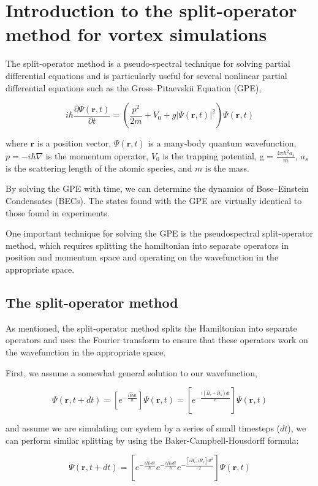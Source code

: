 \chapter{Introduction to the split-operator method for vortex simulations}
\label{ch-splitop}

The split-operator method is a pseudo-spectral technique for solving partial differential equations and is particularly useful for several nonlinear partial differential equations such as the Gross--Pitaevskii Equation (GPE),

$$
i \hbar \frac{\partial \Psi(\mathbf{r},t)}{\partial t} = \left(\frac{p^2}{2m} + V_0 + g |\Psi(\mathbf{r},t)|^2 \right)\Psi(\mathbf{r},t)
$$

where $\mathbf{r}$ is a position vector, $\Psi(\mathbf{r},t)$ is a many-body quantum wavefunction, $p = -i\hbar\nabla$ is the momentum operator, $V_0$ is the trapping potential, g = $\frac{4\pi\hbar^2 a_s}{m}$, $a_s$ is the scattering length of the atomic species, and $m$ is the mass.

By solving the GPE with time, we can determine the dynamics of Bose--Einstein Condensates (BECs).
The states found with the GPE are virtually identical to those found in experiments.

One important technique for solving the GPE is the pseudospectral split-operator method, which requires splitting the hamiltonian into separate operators in position and momentum space and operating on the wavefunction in the appropriate space.

\section{The split-operator method}

As mentioned, the split-operator method splits the Hamiltonian into separate operators and uses the Fourier transform to ensure that these operators work on the wavefunction in the appropriate space.

First, we assume a somewhat general solution to our wavefunction,

$$
\Psi(\mathbf{r},t + dt) = \left[e^{-\frac{i\hat{H}dt}{\hbar}}\right]\Psi(\mathbf{r},t) = \left[e^{-\frac{i(\hat{H}_r + \hat{H}_k)dt}{\hbar}}\right]\Psi(\mathbf{r},t)
$$

and assume we are simulating our system by a series of small timesteps ($dt$), we can perform similar splitting by using the Baker-Campbell-Housdorff formula:

$$
\Psi(\mathbf{r},t+dt) = \left[e^{-\frac{i\hat{H}_rdt}{\hbar}}e^{-\frac{i\hat{H}_kdt}{\hbar}}e^{-\frac{[i\hat{H}_r, i\hat{H}_k]dt^2}{2}}\right]\Psi(\mathbf{r},t)
$$

